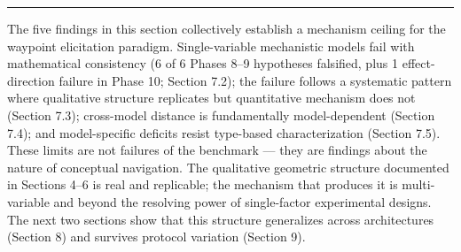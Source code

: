 \begin{center}\rule{0.5\linewidth}{0.5pt}\end{center}

The five findings in this section collectively establish a mechanism ceiling for the waypoint elicitation paradigm. Single-variable mechanistic models fail with mathematical consistency (6 of 6 Phases 8--9 hypotheses falsified, plus 1 effect-direction failure in Phase 10; Section 7.2); the failure follows a systematic pattern where qualitative structure replicates but quantitative mechanism does not (Section 7.3); cross-model distance is fundamentally model-dependent (Section 7.4); and model-specific deficits resist type-based characterization (Section 7.5). These limits are not failures of the benchmark --- they are findings about the nature of conceptual navigation. The qualitative geometric structure documented in Sections 4--6 is real and replicable; the mechanism that produces it is multi-variable and beyond the resolving power of single-factor experimental designs. The next two sections show that this structure generalizes across architectures (Section 8) and survives protocol variation (Section 9).
